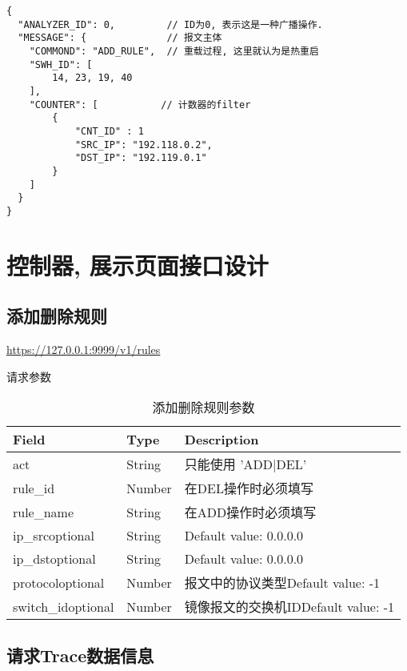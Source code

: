 \begin{lstlisting}
{
  "ANALYZER_ID": 0,         // ID为0, 表示这是一种广播操作.
  "MESSAGE": {              // 报文主体
    "COMMOND": "ADD_RULE",  // 重载过程, 这里就认为是热重启
    "SWH_ID": [
        14, 23, 19, 40
    ],
    "COUNTER": [           // 计数器的filter
        {
            "CNT_ID" : 1
            "SRC_IP": "192.118.0.2",
            "DST_IP": "192.119.0.1"
        }
    ]
  }
}
\end{lstlisting}

\section{控制器, 展示页面接口设计}

\subsection{添加删除规则}

\url{https://127.0.0.1:9999/v1/rules}

请求参数

\begin{table}[]
    \centering
    \caption{添加删除规则参数}
    \label{tbl:add_del_rule}
    \begin{tabular}{lll}
    Field              & Type   & Description                 \\ \hline
    act                & String & 只能使用 'ADD|DEL'              \\
    rule\_id           & Number & 在DEL操作时必须填写                 \\
    rule\_name         & String & 在ADD操作时必须填写                 \\
    ip\_srcoptional    & String & Default value: 0.0.0.0      \\
    ip\_dstoptional    & String & Default value: 0.0.0.0      \\
    protocoloptional   & Number & 报文中的协议类型Default value: -1   \\
    switch\_idoptional & Number & 镜像报文的交换机IDDefault value: -1 \\ \hline
    \end{tabular}
\end{table}

\subsection{请求Trace数据信息}

